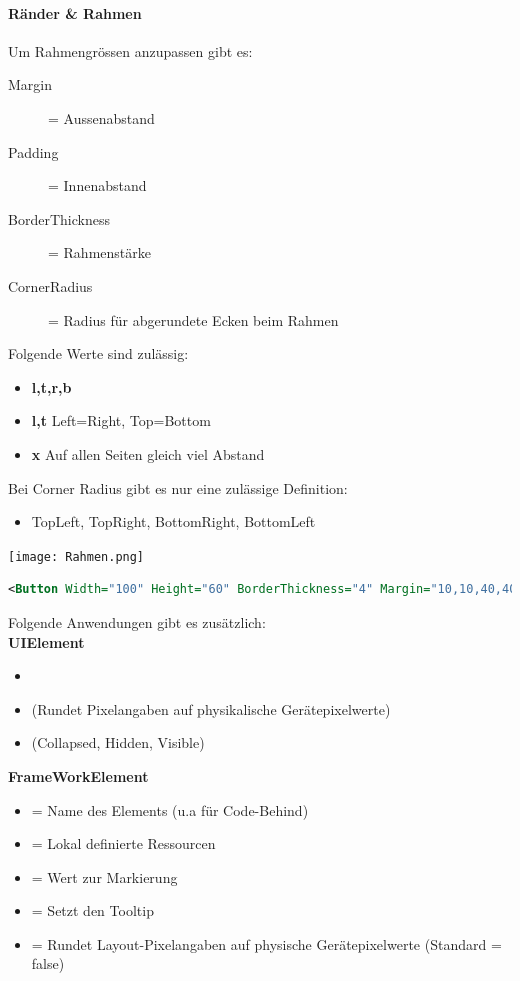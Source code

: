 \paragraph{Ränder \& Rahmen} Um Rahmengrössen anzupassen gibt es:
\begin{description}
    \item[Margin] = Aussenabstand
    \item[Padding] = Innenabstand
    \item[BorderThickness] = Rahmenstärke
    \item[CornerRadius] = Radius für abgerundete Ecken beim Rahmen
\end{description}
Folgende Werte sind zulässig:
\begin{itemize}
\item \textbf{l,t,r,b}
\item \textbf{l,t} Left=Right, Top=Bottom
\item \textbf{x} Auf allen Seiten gleich viel Abstand
\end{itemize}
Bei Corner Radius gibt es nur eine zulässige Definition:
\begin{itemize}
\item TopLeft, TopRight, BottomRight, BottomLeft
\end{itemize}
\texttt{[image: Rahmen.png]}
\begin{lstlisting}[language=xml]
<Button Width="100" Height="60" BorderThickness="4" Margin="10,10,40,40" Padding="30,20,10,10" Content="Element" /> 
\end{lstlisting}
Folgende Anwendungen gibt es zusätzlich: \\
\textbf{UIElement}
\begin{itemize}
    \item {}
    \item {} (Rundet Pixelangaben auf physikalische Gerätepixelwerte)
    \item {} (Collapsed, Hidden, Visible)
\end{itemize}
\textbf{FrameWorkElement}
\begin{itemize}
    \item {} = Name des Elements (u.a für Code-Behind)
    \item {} = Lokal definierte Ressourcen 
    \item {} = Wert zur Markierung
    \item {} = Setzt den Tooltip
    \item {} = Rundet Layout-Pixelangaben auf physische Gerätepixelwerte (Standard = false)
\end{itemize}
